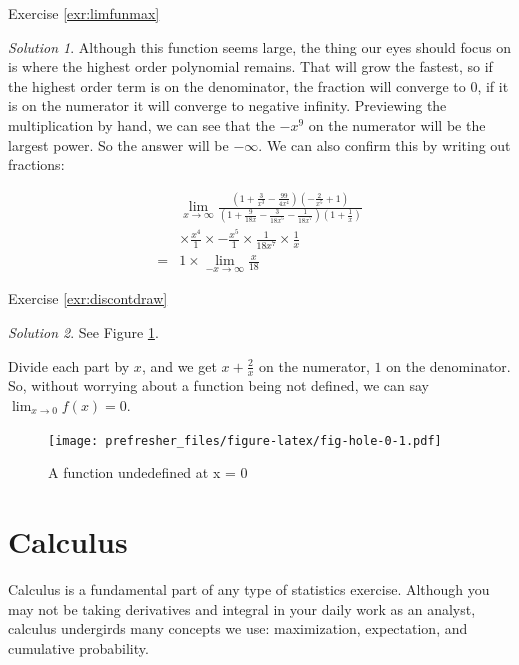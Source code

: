 \documentclass[
]{book}
\theoremstyle{definition}
\theoremstyle{definition}
\theoremstyle{definition}
\theoremstyle{remark}
\newtheorem*{solution}{Solution}
\begin{document}
Exercise \ref{exr:limfunmax}

\begin{solution}
{}Although this function seems large, the thing our eyes should focus on is where the highest order polynomial remains. That will grow the fastest, so if the highest order term is on the denominator, the fraction will converge to 0, if it is on the numerator it will converge to negative infinity. Previewing the multiplication by hand, we can see that the \(-x^9\) on the numerator will be the largest power. So the answer will be \(-\infty\). We can also confirm this by writing out fractions:

\begin{align*}  
& \lim_{x\to\infty}\frac{\left(1 + \frac{3}{x^3} - \frac{99}{4x^4}\right)\left(-\frac{2}{x^5} + 1\right)}{\left(1 + \frac{9}{18x} - \frac{3}{18x^5} - \frac{1}{18x^7} \right)\left(1 + \frac{1}{x}\right)} \\
&\times \frac{x^4}{1} \times -\frac{x^5}{1} \times \frac{1}{18x^7}\times \frac{1}{x}\\
=& 1 \times \lim_{-x\to\infty} \frac{x}{18}
\end{align*}
\end{solution}

Exercise \ref{exr:discontdraw}

\begin{solution}
{}
See Figure \ref{fig:fig-hole-0}.

Divide each part by \(x\), and we get \(x + \frac{2}{x}\) on the numerator, \(1\) on the denominator. So, without worrying about a function being not defined, we can say \(\lim_{x\to 0}f(x) = 0\).
\end{solution}

\begin{figure}
\centering
\texttt{[image: prefresher\_files/figure-latex/fig-hole-0-1.pdf]}
\caption{\label{fig:fig-hole-0}A function undedefined at x = 0}
\end{figure}

\hypertarget{derivatives}{%
\chapter{Calculus}\label{derivatives}}

Calculus is a fundamental part of any type of statistics exercise. Although you may not be taking derivatives and integral in your daily work as an analyst, calculus undergirds many concepts we use: maximization, expectation, and cumulative probability.
\end{document}
